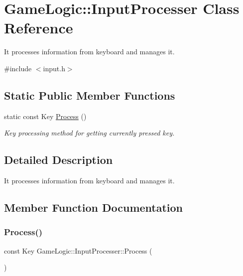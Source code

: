 \hypertarget{classGameLogic_1_1InputProcesser}{}\section{Game\+Logic\+:\+:Input\+Processer Class Reference}
\label{classGameLogic_1_1InputProcesser}


It processes information from keyboard and manages it.  




{\ttfamily \#include $<$input.\+h$>$}

\subsection*{Static Public Member Functions}
\begin{DoxyCompactItemize}
\item 
static const Key \hyperlink{classGameLogic_1_1InputProcesser_a731bbe53369896177362308e4ff4974d}{Process} ()
\begin{DoxyCompactList}\small\item\em Key processing method for getting currently pressed key. \end{DoxyCompactList}\end{DoxyCompactItemize}


\subsection{Detailed Description}
It processes information from keyboard and manages it. 

\subsection{Member Function Documentation}
\mbox{\label{classGameLogic_1_1InputProcesser_a731bbe53369896177362308e4ff4974d}} 
\subsubsection{\texorpdfstring{Process()}{Process()}}
{\footnotesize\ttfamily const Key Game\+Logic\+::\+Input\+Processer\+::\+Process (\begin{DoxyParamCaption}{ }\end{DoxyParamCaption})\hspace{0.3cm}{\ttfamily [static]}}



